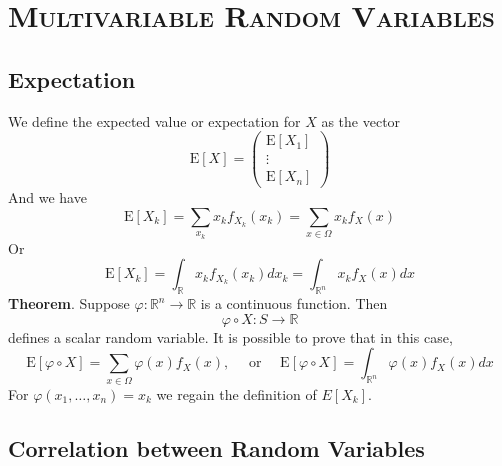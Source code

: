 \documentclass[a4paper,12pt]{article}
\begin{document}
        \section{\textsc{Multivariable Random Variables}}
        \subsection{Expectation}
        We define the expected value or expectation for $X$ as the vector
$$
\mathrm{E}[X]=\left(\begin{array}{c}
\mathrm{E}\left[X_1\right] \\
\vdots \\
\mathrm{E}\left[X_n\right]
\end{array}\right)
$$
And we have
\begin{equation}
    \mathrm{E}\left[X_k\right]=\sum_{x_k} x_k f_{X_k}\left(x_k\right)=\sum_{x \in \Omega} x_k f_X(x)
    \end{equation}
    Or
    \begin{equation}
        \mathrm{E}\left[X_k\right]=\int_{\mathbb{R}} x_k f_{X_k}\left(x_k\right) d x_k=\int_{\mathbb{R}^n} x_k f_X(x) d x
        \end{equation}
        \textbf{Theorem}. Suppose $\varphi: \mathbb{R}^n \rightarrow \mathbb{R}$ is a continuous function. Then
        $$
        \varphi \circ X: S \rightarrow \mathbb{R}
        $$
        defines a scalar random variable. It is possible to prove that in this case,
        $$
        \mathrm{E}[\varphi \circ X]=\sum_{x \in \Omega} \varphi(x) f_X(x), \quad \text { or } \quad \mathrm{E}[\varphi \circ X]=\int_{\mathbb{R}^n} \varphi(x) f_X(x) d x
        $$
        For $\varphi\left(x_1, \ldots, x_n\right)=x_k$ we regain the definition of $E\left[X_k\right]$.

        \subsection{Correlation between Random Variables}
\end{document}
